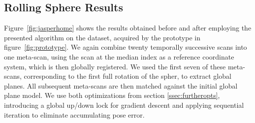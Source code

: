 \subsection{Rolling Sphere Results}

Figure~\ref{fig:jasperhome} shows the results obtained before and after employing the presented algorithm on the dataset, acquired by the prototype in figure~\ref{fig:prototype}.
We again combine twenty temporally successive scans into one meta-scan, using the scan at the median index as a reference coordinate system, which is then globally registered.
We used the first seven of these meta-scans, corresponding to the first full rotation of the spher, to extract global planes.
All subsequent meta-scans are then matched against the initial global plane model.
We use both optimizations from section \ref{ssec:furtheropts}, introducing a global up/down lock for gradient descent and applying sequential iteration to eliminate accumulating pose error.



